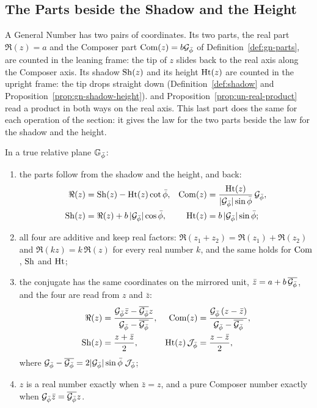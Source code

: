 \subsection[The Parts beside Shadow and Height]{The Parts beside the Shadow and the Height}\label{subsec:gn-parts-beside}

A General Number has two pairs of coordinates. Its two parts, the real part $\Re(z) = a$ and the Composer part $\operatorname{Com}(z) = b\mathcal{G}_{\bar{\phi}}$ of Definition~\ref{def:gn-parts}, are counted in the leaning frame: the tip of $z$ slides back to the real axis along the Composer axis. Its shadow $\operatorname{Sh}(z)$ and its height $\operatorname{Ht}(z)$ are counted in the upright frame: the tip drops straight down (Definition~\ref{def:shadow} and Proposition~\ref{prop:gn-shadow-height}).  and Proposition~\ref{prop:un-real-product} read a product in both ways on the real axis. This last part does the same for each operation of the section: it gives the law for the two parts beside the law for the shadow and the height.

\begin{proposition}\label{prop:gn-parts-readings}
In a true relative plane $\mathbb{G}_{\bar{\phi}}$:
\begin{enumerate}
  \item the parts follow from the shadow and the height, and back:
  \begin{align*}
  \Re(z) &= \operatorname{Sh}(z) - \operatorname{Ht}(z)\cot\bar{\phi} , & \operatorname{Com}(z) &= \frac{\operatorname{Ht}(z)}{|\mathcal{G}_{\bar{\phi}}|\sin\bar{\phi}}\,\mathcal{G}_{\bar{\phi}} , \\
  \operatorname{Sh}(z) &= \Re(z) + b\,|\mathcal{G}_{\bar{\phi}}|\cos\bar{\phi} , & \operatorname{Ht}(z) &= b\,|\mathcal{G}_{\bar{\phi}}|\sin\bar{\phi} ;
  \end{align*}
  \item all four are additive and keep real factors: $\Re(z_1 + z_2) = \Re(z_1) + \Re(z_2)$ and $\Re(kz) = k\,\Re(z)$ for every real number $k$, and the same holds for $\operatorname{Com}$, $\operatorname{Sh}$ and $\operatorname{Ht}$;
  \item the conjugate has the same coordinates on the mirrored unit, $\bar{z} = a + b\,\overline{\mathcal{G}_{\bar{\phi}}}$, and the four are read from $z$ and $\bar{z}$:
  \begin{align*}
  \Re(z) &= \frac{\mathcal{G}_{\bar{\phi}}\bar{z} - \overline{\mathcal{G}_{\bar{\phi}}}z}{\mathcal{G}_{\bar{\phi}} - \overline{\mathcal{G}_{\bar{\phi}}}} , & \operatorname{Com}(z) &= \frac{\mathcal{G}_{\bar{\phi}}\,(z - \bar{z})}{\mathcal{G}_{\bar{\phi}} - \overline{\mathcal{G}_{\bar{\phi}}}} , \\
  \operatorname{Sh}(z) &= \frac{z + \bar{z}}{2} , & \operatorname{Ht}(z)\,\mathcal{J}_{\bar{\phi}} &= \frac{z - \bar{z}}{2} ,
  \end{align*}
  where $\mathcal{G}_{\bar{\phi}} - \overline{\mathcal{G}_{\bar{\phi}}} = 2|\mathcal{G}_{\bar{\phi}}|\sin\bar{\phi}\;\mathcal{J}_{\bar{\phi}}$;
  \item $z$ is a real number exactly when $\bar{z} = z$, and a pure Composer number exactly when $\mathcal{G}_{\bar{\phi}}\bar{z} = \overline{\mathcal{G}_{\bar{\phi}}}z$.
\end{enumerate}
\end{proposition}


